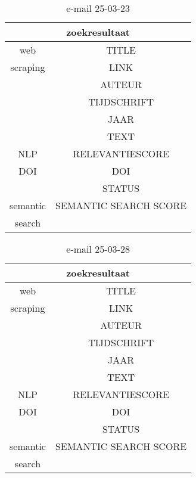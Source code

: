 \begin{table}[h!]
    \caption{e-mail 25-03-23}
    \centering
    \begin{tabular}{|c|c|} 
        \hline
        \multicolumn{2}{|c|}{\textbf{zoekresultaat}} \\
        \hline
        web &TITLE\\
        scraping&LINK\\
        &AUTEUR\\
        &TIJDSCHRIFT\\
        &JAAR\\
        &TEXT\\
        \hline
        NLP&RELEVANTIESCORE\\
        \hline
        DOI&DOI\\
        &STATUS\\
        \hline
        semantic&SEMANTIC SEARCH SCORE\\
        search&\\
        \hline
    \end{tabular}
    \label{table:email20250323}
\end{table}
\begin{table}[h!]
    \caption{e-mail 25-03-28}
    \centering
    \begin{tabular}{|c|c|} 
        \hline
        \multicolumn{2}{|c|}{\textbf{zoekresultaat}} \\
        \hline
        web &TITLE\\
        scraping&LINK\\
        &AUTEUR\\
        &TIJDSCHRIFT\\
        &JAAR\\
        &TEXT\\
        \hline
        NLP&RELEVANTIESCORE\\
        \hline
        DOI&DOI\\
        &STATUS\\
        \hline
        semantic&SEMANTIC SEARCH SCORE\\
        search&\\
        \hline
    \end{tabular}
    \label{table:email20250328}
\end{table}
